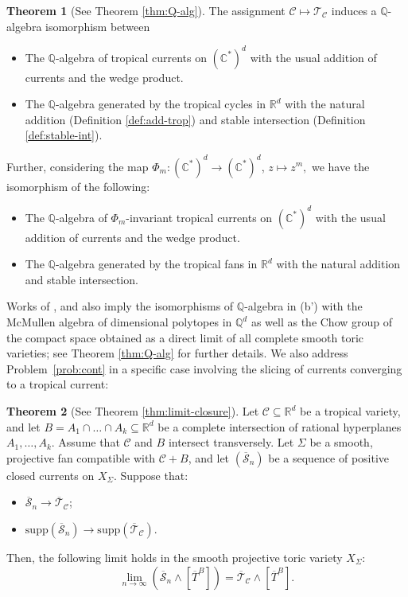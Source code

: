 \documentclass[11pt]{amsart}
\theoremstyle{definition}
\newcommand{\R}{\mathbb{R}}
\newcommand{\lto}{\longrightarrow}
\newcommand{\lmto}{\longmapsto}
\newcommand{\C}{\mathbb{C}}
\newcommand{\cC}{\mathcal{C}}
\newcommand{\sT}{\mathscr{T}}
\newcommand{\supp}[1]{{\mathrm{supp}(#1)}}
\newtheorem{itheorem}{Theorem}
\begin{document}
\begin{itheorem}[See Theorem \ref{thm:Q-alg}]\label{thm:into_ring_iso}
   The assignment $ \cC \lmto \sT_{\cC} $ induces a $\mathbb{Q}$-algebra  isomorphism between
   \begin{itemize}
        \item [(a)] The $\mathbb{Q}$-algebra of tropical currents on $(\C^*)^d$ with the usual addition of currents and the wedge product.
        \item [(b)] The $\mathbb{Q}$-algebra generated by the tropical cycles in $\R^d$ with the natural addition  (Definition \ref{def:add-trop}) and stable intersection (Definition \ref{def:stable-int}).
   \end{itemize}
Further, considering the map $\Phi_m: (\C^*)^d \lto (\C^*)^d$,  $z\lmto z^m,$ we have the isomorphism of the following:
\begin{itemize}
\item [(a')] The $\mathbb{Q}$-algebra of $\Phi_m$-invariant tropical currents on $(\C^*)^d$ with the usual addition of currents and the wedge product.
\item [(b')] The $\mathbb{Q}$-algebra generated by the tropical fans in $\R^d$ with the natural addition  and stable intersection. 
\end{itemize}
\end{itheorem}
Works of \cite{Fulton--Sturmfels}, \cite{Kazarnovski} and \cite{Jensen-Yu} also imply the isomorphisms of $\mathbb{Q}$-algebra in (b') with the McMullen algebra of dimensional polytopes in $\mathbb{Q}^d$ as well as the Chow group of the compact space obtained as a direct limit of all complete smooth toric varieties; see Theorem \ref{thm:Q-alg} for further details. 
\vskip 2mm
We also address Problem~\ref{prob:cont} in a specific case involving the slicing of currents converging to a tropical current:
\begin{itheorem}[See Theorem \ref{thm:limit-closure}]\label{ithm:limit-closure}
Let $\mathcal{C} \subseteq \mathbb{R}^d$ be a tropical variety, and let $B = A_1 \cap \dots \cap A_k \subseteq \mathbb{R}^d$ be a complete intersection of rational hyperplanes $A_1, \dots, A_k$. Assume that $\mathcal{C}$ and $B$ intersect transversely. Let $\Sigma$ be a smooth, projective fan compatible with $\mathcal{C} + B$, and let $(\overline{\mathscr{S}}_n)$ be a sequence of positive closed currents on $X_{\Sigma}$. Suppose that:
\begin{itemize}
    \item[(a)] $\overline{\mathscr{S}}_n \lto \overline{\mathscr{T}}_{\mathcal{C}}$;
    \item[(b)] $\supp{\overline{\mathscr{S}}_n} \lto \supp{\overline{\mathscr{T}}_{\mathcal{C}}}$.
\end{itemize}

Then, the following limit holds in the smooth projective toric variety $X_{\Sigma}$:
\[
\lim_{n \to \infty} \left(\overline{\mathscr{S}}_n \wedge [\overline{T}^{B}]\right) = \overline{\mathscr{T}}_{\mathcal{C}} \wedge [\overline{T}^B].
\]
\end{itheorem}
\end{document}
